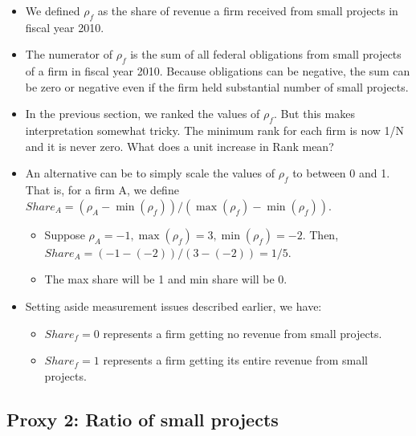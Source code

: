 \documentclass[]{article}
\providecommand{\tightlist}{%
  \setlength{\itemsep}{0pt}\setlength{\parskip}{0pt}}
\begin{document}
\begin{itemize}
\tightlist
\item
  We defined \(\rho_f\) as the share of revenue a firm received from
  small projects in fiscal year 2010.
\item
  The numerator of \(\rho_f\) is the sum of all federal obligations from
  small projects of a firm in fiscal year 2010. Because obligations can
  be negative, the sum can be zero or negative even if the firm held
  substantial number of small projects.
\item
  In the previous section, we ranked the values of \(\rho_f\). But this
  makes interpretation somewhat tricky. The minimum rank for each firm
  is now 1/N and it is never zero. What does a unit increase in Rank
  mean?
\item
  An alternative can be to simply scale the values of \(\rho_f\) to
  between 0 and 1. That is, for a firm A, we define
  \(Share_A = (\rho_A - \min(\rho_f))/(\max(\rho_f)-\min(\rho_f))\).

  \begin{itemize}
  \tightlist
  \item
    Suppose \(\rho_A= -1,\max(\rho_f)=3,\min(\rho_f)=-2\). Then,
    \(Share_A = (-1-(-2))/(3-(-2))=1/5.\)
  \item
    The max share will be 1 and min share will be 0.
  \end{itemize}
\item
  Setting aside measurement issues described earlier, we have:

  \begin{itemize}
  \tightlist
  \item
    \(Share_f=0\) represents a firm getting no revenue from small
    projects.
  \item
    \(Share_f=1\) represents a firm getting its entire revenue from
    small projects.
  \end{itemize}
\end{itemize}

\hypertarget{proxy-2-ratio-of-small-projects}{%
\subsection{Proxy 2: Ratio of small
projects}\label{proxy-2-ratio-of-small-projects}}
\end{document}
